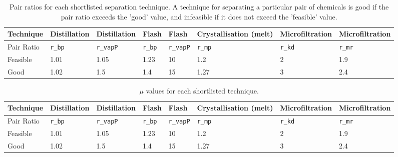 \begin{landscape}
\begin{table}[H]
\centering
\caption{Pair ratios for each shortlisted separation technique. A technique for separating a particular pair of chemicals is good if the pair ratio exceeds the 'good' value, and infeasible if it does not exceed the 'feasible' value.}
\label{tab:separation-pair-ratio}
\begin{tabular}{llllllll}
\toprule
Technique  & Distillation & Distillation & Flash & Flash   & Crystallisation (melt) & Microfiltration & Microfiltration \\ \midrule
Pair Ratio & \texttt{r\_bp}        & \texttt{r\_vapP}      & \texttt{r\_bp} & \texttt{r\_vapP} & \texttt{r\_mp}                  & \texttt{r\_kd}           & \texttt{r\_mr}           \\
Feasible   & 1.01         & 1.05         & 1.23  & 10      & 1.2                    & 2               & 1.9             \\
Good       & 1.02         & 1.5          & 1.4   & 15      & 1.27                   & 3               & 2.4             \\ \bottomrule
\end{tabular}
\end{table}


\begin{table}[h]
\centering
\caption{$\mu$ values for each shortlisted technique.}
\label{tab:separation-mu}
\begin{tabular}{llllllll}
\toprule
Technique  & Distillation   & Distillation     & Flash          & Flash            & Crystallisation (melt) & Microfiltration & Microfiltration \\ \midrule
Pair Ratio & \texttt{r\_bp} & \texttt{r\_vapP} & \texttt{r\_bp} & \texttt{r\_vapP} & \texttt{r\_mp}         & \texttt{r\_kd}  & \texttt{r\_mr}  \\
Feasible   & 1.01           & 1.05             & 1.23           & 10               & 1.2                    & 2               & 1.9             \\
Good       & 1.02           & 1.5              & 1.4            & 15               & 1.27                   & 3               & 2.4             \\ \bottomrule
\end{tabular}
\end{table}
\end{landscape}



